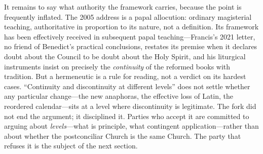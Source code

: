 It remains to say what authority the framework carries, because the point is frequently inflated. The 2005 address is a papal allocution: ordinary magisterial teaching, authoritative in proportion to its nature, not a definition. Its framework has been effectively received in subsequent papal teaching---Francis's 2021 letter, no friend of Benedict's practical conclusions, restates its premise when it declares doubt about the Council to be doubt about the Holy Spirit, and his liturgical instruments insist on precisely the \emph{continuity} of the reformed books with tradition. But a hermeneutic is a rule for reading, not a verdict on its hardest cases. ``Continuity and discontinuity at different levels'' does not settle whether any particular change---the new anaphoras, the effective loss of Latin, the reordered calendar---sits at a level where discontinuity is legitimate. The fork did not end the argument; it disciplined it. Parties who accept it are committed to arguing about \emph{levels}---what is principle, what contingent application---rather than about whether the postconciliar Church is the same Church. The party that refuses it is the subject of the next section.
